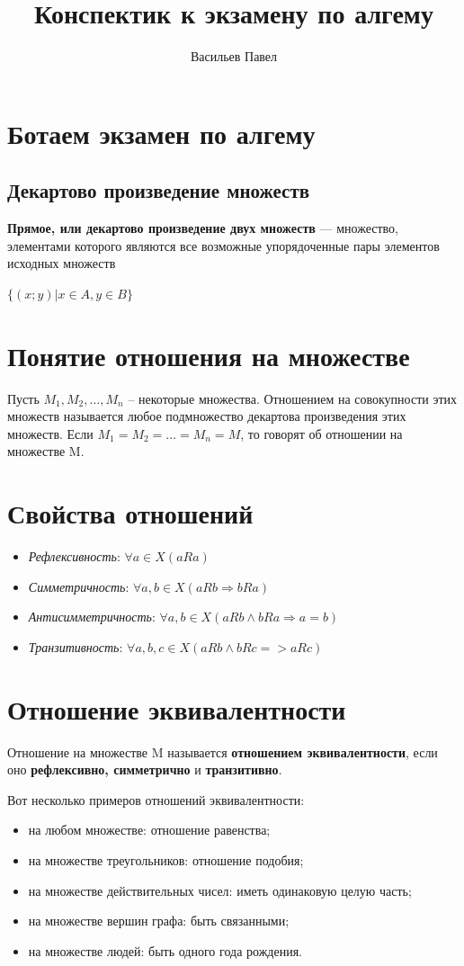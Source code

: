 \documentclass[a4paper]{article}
\title{Конспектик к экзамену по алгему}
\author{Васильев Павел}
\begin{document}
\section*{Ботаем экзамен по алгему}
\subsection*{Декартово произведение множеств}

\textbf{Прямое, или декартово произведение двух множеств} — множество, элементами которого являются все возможные упорядоченные пары элементов исходных множеств

$\{ (x;y) | x \in A, y \in B \}$

\section*{Понятие отношения на множестве
}
Пусть $M_1, M_2, …, M_n$ – некоторые множества.
Отношением на совокупности этих множеств называется любое подмножество
декартова произведения этих множеств. Если $M_1 = M_2 = … = M_n = M$, то говорят об отношении на множестве M.

\section*{Свойства отношений}

\begin{itemize}
\item \textit{Рефлексивность}: $\forall a \in X (a R a)$
\item \textit{Симметричность}: $\forall a, b \in X (a R b \Rightarrow b R a)$
\item \textit{Антисимметричность}: $\forall a, b \in X (a R b \land b R a \Rightarrow a = b)$
\item \textit{Транзитивность}: $\forall a, b, c \in X (a R b \land b R c => a R c)$


\end{itemize}


\section*{Отношение эквивалентности
}
Отношение на множестве M называется \textbf{отношением
эквивалентности}, если оно \textbf{рефлексивно, симметрично} и \textbf{транзитивно}.

Вот несколько примеров отношений эквивалентности:
\begin{itemize}
\item на любом множестве: отношение равенства;
\item на множестве треугольников: отношение подобия;
\item на множестве действительных чисел: иметь одинаковую целую часть;
\item на множестве вершин графа: быть связанными;
\item на множестве людей: быть одного года рождения.
\end{itemize}
\end{document}
